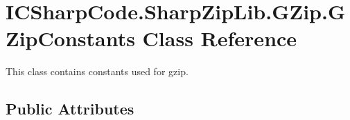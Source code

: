 \hypertarget{class_i_c_sharp_code_1_1_sharp_zip_lib_1_1_g_zip_1_1_g_zip_constants}{}\section{I\+C\+Sharp\+Code.\+Sharp\+Zip\+Lib.\+G\+Zip.\+G\+Zip\+Constants Class Reference}
\label{class_i_c_sharp_code_1_1_sharp_zip_lib_1_1_g_zip_1_1_g_zip_constants}


This class contains constants used for gzip.  


\subsection*{Public Attributes}
